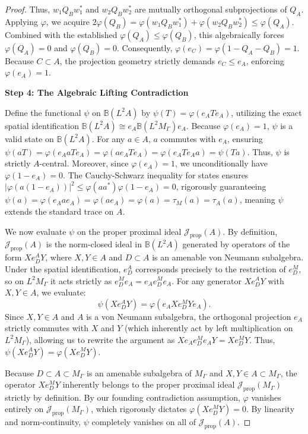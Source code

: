 \documentclass[12pt]{article}
\begin{document}
\begin{proof}
Thus, $w_1 Q_B w_1^*$ and $w_2 Q_B w_2^*$ are mutually orthogonal subprojections of $Q_A$. 
Applying $\varphi$, we acquire $2 \varphi(Q_B) = \varphi(w_1 Q_B w_1^*) + \varphi(w_2 Q_B w_2^*) \le \varphi(Q_A)$. Combined with the established $\varphi(Q_A) \le \varphi(Q_B)$, this algebraically forces $\varphi(Q_A) = 0$ and $\varphi(Q_B) = 0$. 
Consequently, $\varphi(e_C) = \varphi(1 - Q_A - Q_B) = 1$. Because $C \subset A$, the projection geometry strictly demands $e_C \le e_A$, enforcing $\varphi(e_A) = 1$.

\medskip\noindent\textbf{Step 4: The Algebraic Lifting Contradiction}

Define the functional $\psi$ on $\mathbb{B}(L^2A)$ by $\psi(T) = \varphi(e_A T e_A)$, utilizing the exact spatial identification $\mathbb{B}(L^2A) \cong e_A \mathbb{B}(L^2M_\Gamma) e_A$. 
Because $\varphi(e_A) = 1$, $\psi$ is a valid state on $\mathbb{B}(L^2A)$. For any $a \in A$, $a$ commutes with $e_A$, ensuring $\psi(a T) = \varphi(e_A a T e_A) = \varphi(a e_A T e_A) = \varphi(e_A T e_A a) = \psi(T a)$. Thus, $\psi$ is strictly $A$-central. Moreover, since $\varphi(e_A) = 1$, we unconditionally have $\varphi(1 - e_A) = 0$. The Cauchy-Schwarz inequality for states ensures $|\varphi(a (1 - e_A))|^2 \le \varphi(a a^*) \varphi(1 - e_A) = 0$, rigorously guaranteeing $\psi(a) = \varphi(e_A a e_A) = \varphi(a e_A) = \varphi(a) = \tau_M(a) = \tau_A(a)$, meaning $\psi$ extends the standard trace on $A$. 

We now evaluate $\psi$ on the proper proximal ideal $\mathcal{J}_{\mathrm{prop}}(A)$. By definition, $\mathcal{J}_{\mathrm{prop}}(A)$ is the norm-closed ideal in $\mathbb{B}(L^2A)$ generated by operators of the form $X e_D^A Y$, where $X, Y \in A$ and $D \subset A$ is an amenable von Neumann subalgebra. Under the spatial identification, $e_D^A$ corresponds precisely to the restriction of $e_D^M$, so on $L^2M_\Gamma$ it acts strictly as $e_D^M e_A = e_A e_D^M e_A$. 
For any generator $X e_D^A Y$ with $X, Y \in A$, we evaluate:
\[
\psi(X e_D^A Y) = \varphi(e_A X e_D^M Y e_A).
\]
Since $X, Y \in A$ and $A$ is a von Neumann subalgebra, the orthogonal projection $e_A$ strictly commutes with $X$ and $Y$ (which inherently act by left multiplication on $L^2M_\Gamma$), allowing us to rewrite the argument as $X e_A e_D^M e_A Y = X e_D^M Y$. 
Thus, $\psi(X e_D^A Y) = \varphi(X e_D^M Y)$.

Because $D \subset A \subset M_\Gamma$ is an amenable subalgebra of $M_\Gamma$ and $X, Y \in A \subset M_\Gamma$, the operator $X e_D^M Y$ inherently belongs to the proper proximal ideal $\mathcal{J}_{\mathrm{prop}}(M_\Gamma)$ strictly by definition. 
By our founding contradiction assumption, $\varphi$ vanishes entirely on $\mathcal{J}_{\mathrm{prop}}(M_\Gamma)$, which rigorously dictates $\varphi(X e_D^M Y) = 0$. 
By linearity and norm-continuity, $\psi$ completely vanishes on all of $\mathcal{J}_{\mathrm{prop}}(A)$.


\end{proof}
\end{document}
